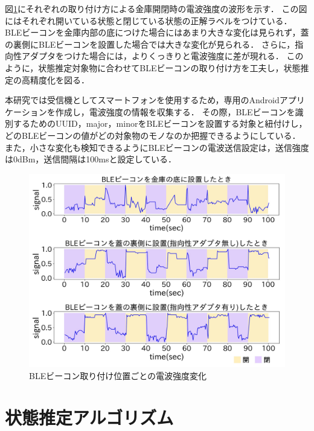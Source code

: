 図\ref{transform-data}にそれぞれの取り付け方による金庫開閉時の電波強度の波形を示す．
この図にはそれぞれ開いている状態と閉じている状態の正解ラベルをつけている．
BLEビーコンを金庫内部の底につけた場合にはあまり大きな変化は見られず，蓋の裏側にBLEビーコンを設置した場合では大きな変化が見られる．
さらに，指向性アダプタをつけた場合には，よりくっきりと電波強度に差が現れる．
このように，状態推定対象物に合わせてBLEビーコンの取り付け方を工夫し，状態推定の高精度化を図る．

本研究では受信機としてスマートフォンを使用するため，専用のAndroidアプリケーションを作成し，電波強度の情報を収集する．
その際，BLEビーコンを識別するためのUUID，major，minorをBLEビーコンを設置する対象と紐付けし，どのBLEビーコンの値がどの対象物のモノなのか把握できるようにしている．
また，小さな変化も検知できるようにBLEビーコンの電波送信設定は，送信強度は0dBm，送信間隔は100msと設定している．

\begin{figure}[H]
    \centering
    \includegraphics[width=14cm]{images/chapter3/in-out.jpg}
    \caption{BLEビーコン取り付け位置ごとの電波強度変化}
    \label{transform-data}
\end{figure}




\section{状態推定アルゴリズム}

